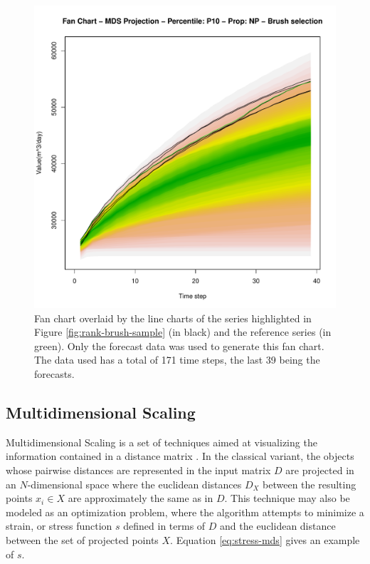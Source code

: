 \documentclass[final,5p,times,twocolumn]{elsarticle}
\begin{document}
\begin{figure}[H]
  \centering
  \includegraphics[width=\columnwidth]{fan-brush-40.pdf}
  \caption{Fan chart overlaid by the line charts of the series highlighted in Figure \ref{fig:rank-brush-sample} (in black) and the reference series (in green). Only the forecast data was used to generate this fan chart. The data used has a total of 171 time steps, the last 39 being the forecasts.}
  \label{fig:sel-ensemble}
\end{figure}

\subsection{Multidimensional Scaling}
\label{sec:mds}
Multidimensional Scaling is a set of techniques aimed at visualizing the information contained in a distance matrix \cite{kruskal:1978}. In the classical variant, the objects whose pairwise distances are represented in the input matrix $D$ are projected in an $N$-dimensional space where the euclidean distances $D_X$ between the resulting points $x_i \in X$ are approximately the same as in $D$. This technique may also be modeled as an optimization problem, where the algorithm attempts to minimize a strain, or stress function $s$ defined in terms of $D$ and the euclidean distance between the set of projected points $X$. Equation \ref{eq:stress-mds} gives an example of $s$.
\end{document}
